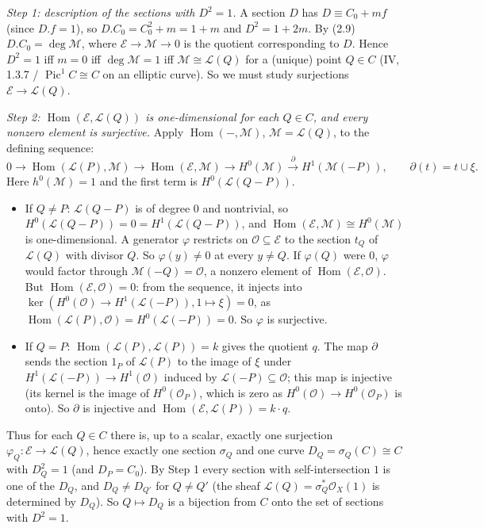 \documentclass[11pt]{article}
\begin{document}
\emph{Step 1: description of the sections with $D^2=1$.} A section $D$ has $D\equiv C_0+mf$ (since $D.f=1$), so $D.C_0=C_0^2+m=1+m$ and $D^2=1+2m$. By (2.9) $D.C_0=\deg\mathcal M$, where $\mathcal E\to\mathcal M\to0$ is the quotient corresponding to $D$. Hence $D^2=1$ iff $m=0$ iff $\deg\mathcal M=1$ iff $\mathcal M\cong\mathcal L(Q)$ for a (unique) point $Q\in C$ (IV, 1.3.7 / $\operatorname{Pic}^1C\cong C$ on an elliptic curve). So we must study surjections $\mathcal E\to\mathcal L(Q)$.

\emph{Step 2: $\operatorname{Hom}(\mathcal E,\mathcal L(Q))$ is one-dimensional for each $Q\in C$, and every nonzero element is surjective.} Apply $\operatorname{Hom}(-,\mathcal M)$, $\mathcal M=\mathcal L(Q)$, to the defining sequence:
\[ 0\to\operatorname{Hom}(\mathcal L(P),\mathcal M)\to\operatorname{Hom}(\mathcal E,\mathcal M)\to H^0(\mathcal M)\xrightarrow{\ \partial\ }H^1(\mathcal M(-P)),\qquad\partial(t)=t\cup\xi . \]
Here $h^0(\mathcal M)=1$ and the first term is $H^0(\mathcal L(Q-P))$.
\begin{itemize}
\item If $Q\ne P$: $\mathcal L(Q-P)$ is of degree 0 and nontrivial, so $H^0(\mathcal L(Q-P))=0=H^1(\mathcal L(Q-P))$, and $\operatorname{Hom}(\mathcal E,\mathcal M)\cong H^0(\mathcal M)$ is one-dimensional. A generator $\varphi$ restricts on $\mathcal O\subseteq\mathcal E$ to the section $t_Q$ of $\mathcal L(Q)$ with divisor $Q$. So $\varphi(y)\ne0$ at every $y\ne Q$. If $\varphi(Q)$ were $0$, $\varphi$ would factor through $\mathcal M(-Q)=\mathcal O$, a nonzero element of $\operatorname{Hom}(\mathcal E,\mathcal O)$. But $\operatorname{Hom}(\mathcal E,\mathcal O)=0$: from the sequence, it injects into $\ker(H^0(\mathcal O)\to H^1(\mathcal L(-P)),1\mapsto\xi)=0$, as $\operatorname{Hom}(\mathcal L(P),\mathcal O)=H^0(\mathcal L(-P))=0$. So $\varphi$ is surjective.
\item If $Q=P$: $\operatorname{Hom}(\mathcal L(P),\mathcal L(P))=k$ gives the quotient $q$. The map $\partial$ sends the section $1_P$ of $\mathcal L(P)$ to the image of $\xi$ under $H^1(\mathcal L(-P))\to H^1(\mathcal O)$ induced by $\mathcal L(-P)\subseteq\mathcal O$; this map is injective (its kernel is the image of $H^0(\mathcal O_P)$, which is zero as $H^0(\mathcal O)\to H^0(\mathcal O_P)$ is onto). So $\partial$ is injective and $\operatorname{Hom}(\mathcal E,\mathcal L(P))=k\cdot q$.
\end{itemize}
Thus for each $Q\in C$ there is, up to a scalar, exactly one surjection $\varphi_Q\colon\mathcal E\to\mathcal L(Q)$, hence exactly one section $\sigma_Q$ and one curve $D_Q=\sigma_Q(C)\cong C$ with $D_Q^2=1$ (and $D_P=C_0$). By Step 1 every section with self-intersection $1$ is one of the $D_Q$, and $D_Q\ne D_{Q'}$ for $Q\ne Q'$ (the sheaf $\mathcal L(Q)=\sigma_Q^*\mathcal O_X(1)$ is determined by $D_Q$). So $Q\mapsto D_Q$ is a bijection from $C$ onto the set of sections with $D^2=1$.
\end{document}
